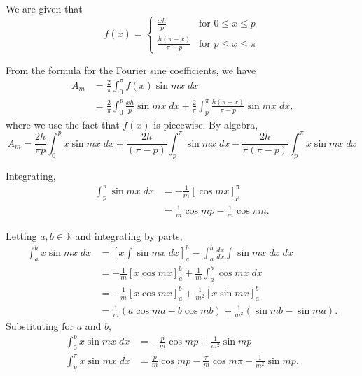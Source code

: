 \documentclass[oneside]{article}
\newcommand\bbR{\mathbb{R}}
\begin{document}
  We are given that \[
    f(x) = \begin{cases}
      \frac{xh}{p} & \text{for }0 \leq x \leq p \\
      \frac{h(\pi-x)}{\pi - p} & \text{for }p \leq x \leq \pi
    \end{cases}
  \]

  From the formula for the Fourier sine coefficients, we have\begin{align*}
    A_m &= \frac{2}{\pi} \int_0^\pi f(x)\sin mx\;dx \\
    &= \frac{2}{\pi} \int_0^p \frac{xh}{p}\sin mx\;dx
      + \frac{2}{\pi} \int_p^\pi \frac{h(\pi-x)}{\pi-p}\sin mx\;dx \text{,}
  \end{align*} where we use the fact that $f(x)$ is piecewise. By algebra,
  \begin{equation}
    \label{eq:am-before-integration}
    A_m = \frac{2h}{\pi p} \int_0^p x\sin mx\;dx
      + \frac{2h}{(\pi - p)} \int_p^\pi \sin mx\;dx
      - \frac{2h}{\pi(\pi - p)} \int_p^\pi x\sin mx\;dx
  \end{equation}

  Integrating,\begin{align*}
    \int_p^\pi \sin mx\;dx
    &= -\frac{1}{m}\left[\cos mx\right]_p^\pi \\
    &= \frac{1}{m}\cos mp - \frac{1}{m}\cos \pi m \text{.}
  \end{align*}

  Letting $a, b \in \bbR$ and integrating by parts, \begin{align*}
    \int_a^b x\sin mx\; dx
    &= \left[x\int\sin mx\;dx\right]_a^b
      - \int_a^b \frac{dx}{dx} \int \sin mx\;dx\;dx \\
    &= -\frac{1}{m}\left[x\cos mx\right]_a^b
      + \frac{1}{m} \int_a^b \cos mx\;dx \\
    &= -\frac{1}{m}\left[x\cos mx\right]_a^b
      + \frac{1}{m^2}\left[x\sin mx\right]_a^b \\
    &= \frac{1}{m}\left(a\cos ma - b\cos mb\right)
      + \frac{1}{m^2}\left(\sin mb - \sin ma\right) \text{.}
  \end{align*} Substituting for $a$ and $b$, \begin{align*}
    \int_0^p x\sin mx\; dx
    &= -\frac{p}{m} \cos mp + \frac{1}{m^2} \sin mp \\
    \int_p^\pi x\sin mx\; dx
    &= \frac{p}{m}\cos mp - \frac{\pi}{m}\cos m\pi - \frac{1}{m^2}\sin mp
    \text{.}
  \end{align*}
\end{document}
